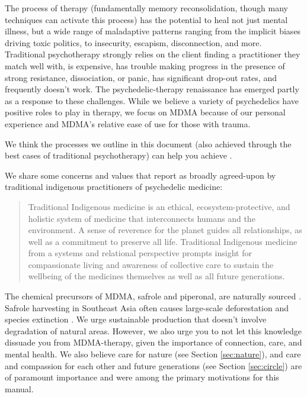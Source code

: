 \documentclass[12pt,letterpaper]{article}
\begin{document}
The process of therapy (fundamentally memory reconsolidation, though many techniques can activate this process) has the potential to heal not just mental illness, but a wide range of maladaptive patterns ranging from the implicit biases driving toxic politics, to insecurity, escapism, disconnection, and more. Traditional psychotherapy strongly relies on the client finding a practitioner they match well with, is expensive, has trouble making progress in the presence of strong resistance, dissociation, or panic, has significant drop-out rates, and frequently doesn't work. The psychedelic-therapy renaissance has emerged partly as a response to these challenges. While we believe a variety of psychedelics have positive roles to play in therapy, we focus on MDMA because of our personal experience and MDMA's relative ease of use for those with trauma.

We think the processes we outline in this document (also achieved through the best cases of traditional psychotherapy) can help you achieve .

We share some concerns and values that \textcite{celidwen2023Indigenous} report as broadly agreed-upon by traditional indigenous practitioners of psychedelic medicine:
\begin{quotation}
    Traditional Indigenous medicine is an ethical, ecosystem-protective, and holistic system of medicine that interconnects humans and the environment. A sense of reverence for the planet guides all relationships, as well as a commitment to preserve all life. Traditional Indigenous medicine from a systems and relational perspective prompts insight for compassionate living and awareness of collective care to sustain the wellbeing of the medicines themselves as well as all future generations.
\end{quotation}
The chemical precursors of MDMA, safrole and piperonal, are naturally sourced \cite{worldDrugReport}. Safrole harvesting in Southeast Asia often causes large-scale deforestation and species extinction \cite{safroleProduction}. We urge sustainable production that doesn't involve degradation of natural areas. However, we also urge you to not let this knowledge dissuade you from MDMA-therapy, given the importance of connection, care, and mental health. We also believe care for nature (see Section \ref{sec:nature}), and care and compassion for each other and future generations (see Section \ref{sec:circle}) are of paramount importance and were among the primary motivations for this manual.
\end{document}
